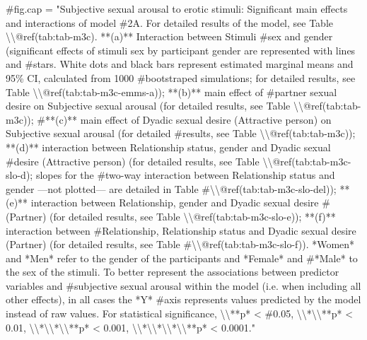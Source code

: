 \documentclass[
  bookmarksnumbered]{article}
\newenvironment{Shaded}{\begin{snugshade}}{\end{snugshade}}
\newcommand{\CommentTok}[1]{\textcolor[rgb]{0.50,0.62,0.50}{#1}}
\begin{document}
\begin{Shaded}
\begin{Highlighting}[]
\CommentTok{\#fig.cap = "Subjective sexual arousal to erotic stimuli: Significant main effects and interactions of model \#2A. For detailed results of the model, see Table \textbackslash{}\textbackslash{}@ref(tab:tab{-}m3c). **(a)** Interaction between Stimuli \#sex and gender (significant effects of stimuli sex by participant gender are represented with lines and \#stars. White dots and black bars represent estimated marginal means and 95\% CI, calculated from 1000 \#bootstraped simulations; for detailed results, see Table \textbackslash{}\textbackslash{}@ref(tab:tab{-}m3c{-}emms{-}a)); **(b)** main effect of \#partner sexual desire on Subjective sexual arousal (for detailed results, see Table \textbackslash{}\textbackslash{}@ref(tab:tab{-}m3c)); \#**(c)** main effect of Dyadic sexual desire (Attractive person) on Subjective sexual arousal  (for detailed \#results, see Table \textbackslash{}\textbackslash{}@ref(tab:tab{-}m3c)); **(d)** interaction between Relationship status, gender and Dyadic sexual \#desire (Attractive person) (for detailed results, see Table \textbackslash{}\textbackslash{}@ref(tab:tab{-}m3c{-}slo{-}d); slopes for the \#two{-}way interaction between Relationship status and gender —not plotted— are detailed in Table \#\textbackslash{}\textbackslash{}@ref(tab:tab{-}m3c{-}slo{-}del)); **(e)** interaction between Relationship, gender and Dyadic sexual desire \#(Partner) (for detailed results, see Table \textbackslash{}\textbackslash{}@ref(tab:tab{-}m3c{-}slo{-}e)); **(f)** interaction between \#Relationship, Relationship status and Dyadic sexual desire (Partner) (for detailed results, see Table \#\textbackslash{}\textbackslash{}@ref(tab:tab{-}m3c{-}slo{-}f)). *Women* and *Men* refer to the gender of the participants and *Female* and \#*Male* to the sex of the stimuli. To better represent the associations between predictor variables and \#subjective sexual arousal within the model (i.e. when including all other effects), in all cases the *Y* \#axis represents values predicted by the model instead of raw values. For statistical significance, \textbackslash{}\textbackslash{}**p* \textless{} \#0.05, \textbackslash{}\textbackslash{}*\textbackslash{}\textbackslash{}**p* \textless{} 0.01, \textbackslash{}\textbackslash{}*\textbackslash{}\textbackslash{}*\textbackslash{}\textbackslash{}**p* \textless{} 0.001, \textbackslash{}\textbackslash{}*\textbackslash{}\textbackslash{}*\textbackslash{}\textbackslash{}*\textbackslash{}\textbackslash{}**p* \textless{} 0.0001."}



\end{Highlighting}
\end{Shaded}
\end{document}
